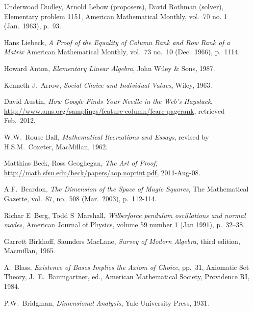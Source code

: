 \begin{thebibliography}{\makebox[2em][c]{{}\hfil{}}}
  Underwood Dudley, Arnold Lebow (proposers), David Rothman (solver),
  Elementary problem 1151,
  American Mathematical Monthly,
  vol.\ 70 no. 1 (Jan.\ 1963),
  p.~93.

  Hans Liebeck,
  \emph{A Proof of the Equality of Column Rank and Row Rank of a Matrix}
  American Mathematical Monthly,
  vol.\ 73 no.\ 10 (Dec.\ 1966),
  p.~1114.

  Howard Anton,
  \emph{Elementary Linear Algebra},
  John Wiley \& Sons,
  1987.

  Kenneth J.~Arrow,
  \emph{Social Choice and Individual Values},
  Wiley,
  1963.

  David Austin,
  \emph{How Google Finds Your Needle in the Web's Haystack},
  \url{http://www.ams.org/samplings/feature-column/fcarc-pagerank},
  retrieved Feb.~2012.

 W.W.~Rouse Ball,
 \emph{Mathematical Recreations and Essays},
 revised by H.S.M.~Coxeter,
 MacMillan,
 1962.


  Matthias Beck, Ross Geoghegan,
  \emph{The Art of Proof},
  \url{http://math.sfsu.edu/beck/papers/aop.noprint.pdf},
  2011-Aug-08.

  A.F.\ Beardon,
  \emph{The Dimension of the Space of Magic Squares},
  The Mathematical Gazette,
  vol.\ 87, no.\ 508 (Mar.\ 2003), p.~112-114.


  Richar E~Berg, Todd S~Marshall,
  \emph{Wilberforce pendulum oscillations and normal modes},
  American Journal of Physics,
  volume 59 number 1 (Jan 1991),
  p.~32--38.

  Garrett Birkhoff, Saunders MacLane,
  \emph{Survey of Modern Algebra},
  third edition,
  Macmillan, 
  1965.

  A.~Blass,
  \emph{Existence of Bases Implies the Axiom of Choice},
  pp.\ 31,
  Axiomatic Set Theory, J.\ E.\ Baumgartner, ed.,
  American Mathematical Society,
  Providence RI, 1984.

  P.W.~Bridgman,
  \emph{Dimensional Analysis},
  Yale University Press,
  1931.


\end{thebibliography}
